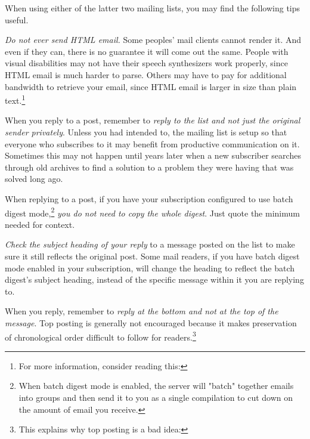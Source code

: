 When using either of the latter two mailing lists, you may find the following tips useful.

\startitemize[3]
\item
{\it Do not ever send HTML email.} Some peoples' mail clients cannot render it. And even if they can, there is no guarantee it will come out the same. People with visual disabilities may not have their speech synthesizers work properly, since HTML email is much harder to parse. Others may have to pay for additional bandwidth to retrieve your email, since HTML email is larger in size than plain text.\footnote{For more information, consider reading this: }

\item
When you reply to a post, remember to {\it reply to the list and not just the original sender privately}. Unless you had intended to, the mailing list is setup so that everyone who subscribes to it may benefit from productive communication on it. Sometimes this may not happen until years later when a new subscriber searches through old archives to find a solution to a problem they were having that was solved long ago.

\item
When replying to a post, if you have your subscription configured to use batch digest mode,\footnote{When batch digest mode is enabled, the server will "batch" together emails into groups and then send it to you as a single compilation to cut down on the amount of email you receive.} {\it you do not need to copy the whole digest}. Just quote the minimum needed for context.

\item
{\it Check the subject heading of your reply} to a message posted on the list to make sure it still reflects the original post. Some mail readers, if you have batch digest mode enabled in your subscription, will change the heading to reflect the batch digest's subject heading, instead of the specific message within it you are replying to.

\item
When you reply, remember to {\it reply at the bottom and not at the top of the message}. Top posting is generally not encouraged because it makes preservation of chronological order difficult to follow for readers.\footnote{This explains why top posting is a bad idea: }
\stopitemize

